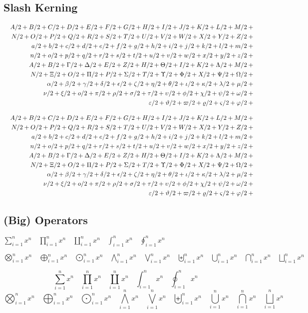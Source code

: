\subsection{Slash Kerning \showfamily}

\def\test#1{1/#1+{}}
\begin{eqnarray*}
  && {\testupperi}\\
  && {\testupperii}\\
  && {\testloweri}\\
  && {\testlowerii}\\
  && {\testupgreeki}\\
  && {\testupgreekii}\\
  && {\testlowgreeki}\\
  && {\testlowgreekii}\\
  && {\testlowgreekiii}
\end{eqnarray*}

\def\test#1{#1/2+{}}
\begin{eqnarray*}
  && {\testupperi}\\
  && {\testupperii}\\
  && {\testloweri}\\
  && {\testlowerii}\\
  && {\testupgreeki}\\
  && {\testupgreekii}\\
  && {\testlowgreeki}\\
  && {\testlowgreekii}\\
  && {\testlowgreekiii}
\end{eqnarray*}


\subsection{(Big) Operators \showfamily}

\def\testop#1{#1_{i=1}^{n} x^{n} \quad}
$
	\testop\sum
	\testop\prod
	\testop\coprod
	\testop\int
	\testop\oint
$

\noindent%
$
	\testop\bigotimes
	\testop\bigoplus
	\testop\bigodot
	\testop\bigwedge
	\testop\bigvee
	\testop\biguplus
	\testop\bigcup
	\testop\bigcap
	\testop\bigsqcup
$

\begin{displaymath}
  \testop\sum
  \testop\prod
  \testop\coprod
  \testop\int
  \testop\oint
\end{displaymath}
\begin{displaymath}
  \testop\bigotimes
  \testop\bigoplus
  \testop\bigodot
  \testop\bigwedge
  \testop\bigvee
  \testop\biguplus
  \testop\bigcup
  \testop\bigcap
  \testop\bigsqcup
\end{displaymath}


